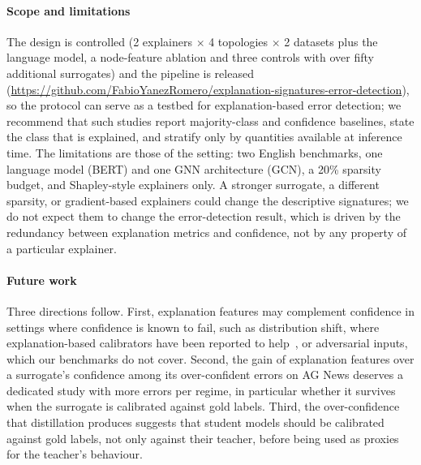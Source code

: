 \paragraph{\textbf{Scope and limitations}}
The design is controlled (2 explainers \(\times\) 4 topologies \(\times\) 2 datasets plus the language model, a node-feature ablation and three controls with over fifty additional surrogates) and the pipeline is released (\url{https://github.com/FabioYanezRomero/explanation-signatures-error-detection}), so the protocol can serve as a testbed for explanation-based error detection; we recommend that such studies report majority-class and confidence baselines, state the class that is explained, and stratify only by quantities available at inference time. The limitations are those of the setting: two English benchmarks, one language model (BERT) and one GNN architecture (GCN), a 20\% sparsity budget, and Shapley-style explainers only. A stronger surrogate, a different sparsity, or gradient-based explainers could change the descriptive signatures; we do not expect them to change the error-detection result, which is driven by the redundancy between explanation metrics and confidence, not by any property of a particular explainer.

\paragraph{\textbf{Future work}}
Three directions follow. First, explanation features may complement confidence in settings where confidence is known to fail, such as distribution shift, where explanation-based calibrators have been reported to help~\cite{ye2022calibrating}, or adversarial inputs, which our benchmarks do not cover. Second, the gain of explanation features over a surrogate's confidence among its over-confident errors on AG News deserves a dedicated study with more errors per regime, in particular whether it survives when the surrogate is calibrated against gold labels. Third, the over-confidence that distillation produces suggests that student models should be calibrated against gold labels, not only against their teacher, before being used as proxies for the teacher's behaviour.
